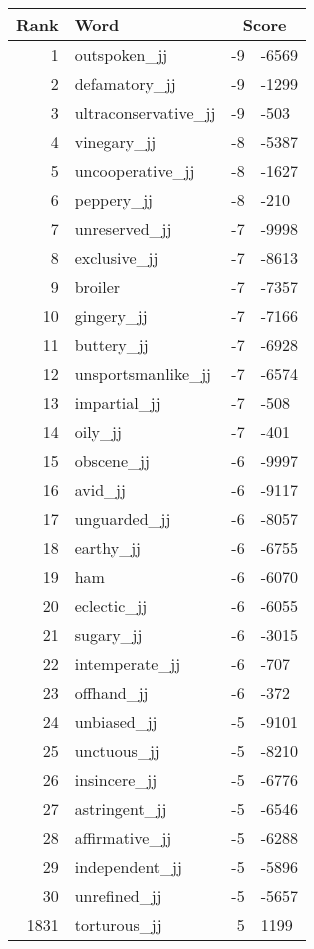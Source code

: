 \begin{longtable}[!htbp]{| rlr@{.}l |}
    \hline
    \textbf{Rank} & \textbf{Word} & \multicolumn{2}{c|}{\textbf{Score}} \\
    \hline
    \endhead
    1 & outspoken\_jj & -9 & -6569 \\
    2 & defamatory\_jj & -9 & -1299 \\
    3 & ultraconservative\_jj & -9 & -503 \\
    4 & vinegary\_jj & -8 & -5387 \\
    5 & uncooperative\_jj & -8 & -1627 \\
    6 & peppery\_jj & -8 & -210 \\
    7 & unreserved\_jj & -7 & -9998 \\
    8 & exclusive\_jj & -7 & -8613 \\
    9 & broiler & -7 & -7357 \\
    10 & gingery\_jj & -7 & -7166 \\
    11 & buttery\_jj & -7 & -6928 \\
    12 & unsportsmanlike\_jj & -7 & -6574 \\
    13 & impartial\_jj & -7 & -508 \\
    14 & oily\_jj & -7 & -401 \\
    15 & obscene\_jj & -6 & -9997 \\
    16 & avid\_jj & -6 & -9117 \\
    17 & unguarded\_jj & -6 & -8057 \\
    18 & earthy\_jj & -6 & -6755 \\
    19 & ham & -6 & -6070 \\
    20 & eclectic\_jj & -6 & -6055 \\
    21 & sugary\_jj & -6 & -3015 \\
    22 & intemperate\_jj & -6 & -707 \\
    23 & offhand\_jj & -6 & -372 \\
    24 & unbiased\_jj & -5 & -9101 \\
    25 & unctuous\_jj & -5 & -8210 \\
    26 & insincere\_jj & -5 & -6776 \\
    27 & astringent\_jj & -5 & -6546 \\
    28 & affirmative\_jj & -5 & -6288 \\
    29 & independent\_jj & -5 & -5896 \\
    30 & unrefined\_jj & -5 & -5657 \\
    1831 & torturous\_jj & 5 & 1199 \\

\end{longtable}
